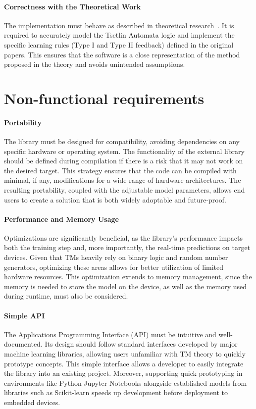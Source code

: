 \documentclass[english]{aghengthesis} %
\begin{document}
\paragraph{Correctness with the Theoretical Work}
The implementation must behave as described in theoretical research~\cite{granmo2021tsetlinmachinegame}. It is required to accurately model the Tsetlin Automata logic and implement the specific learning rules (Type I and Type II feedback) defined in the original papers. This ensures that the software is a close representation of the method proposed in the theory and avoids unintended assumptions.


\section{Non-functional requirements}

\paragraph{Portability}
The library must be designed for compatibility, avoiding dependencies on any specific hardware or operating system. The functionality of the external library should be defined during compilation if there is a risk that it may not work on the desired target. This strategy ensures that the code can be compiled with minimal, if any, modifications for a wide range of hardware architectures. The resulting portability, coupled with the adjustable model parameters, allows end users to create a solution that is both widely adoptable and future-proof.

\paragraph{Performance and Memory Usage}
Optimizations are significantly beneficial, as the library's performance impacts both the training step and, more importantly, the real-time predictions on target devices. Given that TMs heavily rely on binary logic and random number generators, optimizing these areas allows for better utilization of limited hardware resources. This optimization extends to memory management, since the memory is needed to store the model on the device, as well as the memory used during runtime, must also be considered.

\paragraph{Simple API}
The Applications Programming Interface (API) must be intuitive and well-documented. Its design should follow standard interfaces developed by major machine learning libraries, allowing users unfamiliar with TM theory to quickly prototype concepts. This simple interface allows a developer to easily integrate the library into an existing project. Moreover, supporting quick prototyping in environments like Python Jupyter Notebooks alongside established models from libraries such as Scikit-learn speeds up development before deployment to embedded devices.
\end{document}
